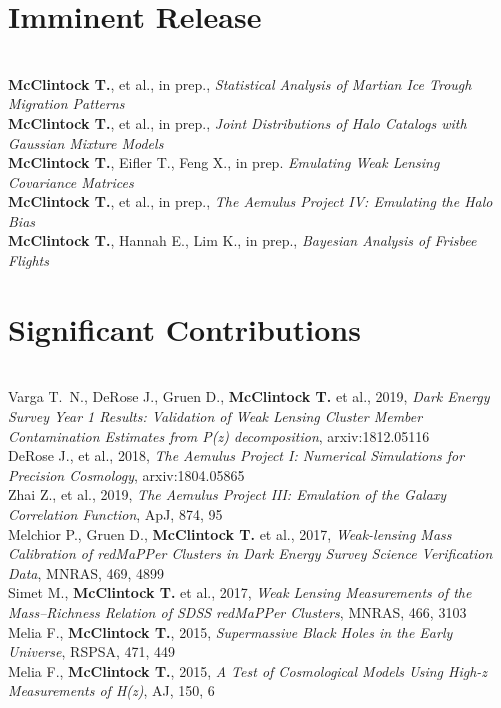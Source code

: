 \documentclass{res}
\begin{document}
\begin{resume}
\vspace{-12pt}
\section{Imminent Release}
\vspace{-8pt}
\hrulefill\\
{\bf McClintock T.}, et al., in prep., {\it Statistical Analysis of Martian Ice Trough Migration Patterns}\\
{\bf McClintock T.}, et al., in prep., {\it Joint Distributions of Halo Catalogs with Gaussian Mixture Models}\\
{\bf McClintock T.}, Eifler T., Feng X., in prep. {\it Emulating Weak Lensing Covariance Matrices}\\
{\bf McClintock T.}, et al., in prep., {\it The Aemulus Project IV: Emulating the Halo Bias}\\
{\bf McClintock T.}, Hannah E., Lim K., in prep., {\it Bayesian Analysis of Frisbee Flights}

\vspace{-12pt}
\section{Significant Contributions}
\vspace{-8pt}
\hrulefill\\
Varga T.~N., DeRose J., Gruen D., {\bf McClintock T.} et al., 2019, {\it Dark Energy Survey Year 1 Results: Validation of Weak Lensing Cluster Member Contamination Estimates from P(z) decomposition}, arxiv:1812.05116\\
DeRose J., et al., 2018, {\it The Aemulus Project I: Numerical Simulations for Precision Cosmology}, arxiv:1804.05865\\
Zhai Z., et al., 2019, {\it The Aemulus Project III: Emulation of the Galaxy Correlation Function}, ApJ, 874, 95\\
Melchior P., Gruen D., {\bf McClintock T.} et al., 2017, {\it Weak-lensing Mass Calibration of redMaPPer Clusters in Dark Energy Survey Science Verification Data}, MNRAS, 469, 4899\\
Simet M., {\bf McClintock T.} et al., 2017, {\it Weak Lensing Measurements of the Mass--Richness Relation of SDSS redMaPPer Clusters}, MNRAS, 466, 3103\\
Melia F., {\bf McClintock T.}, 2015, {\it Supermassive Black Holes in the Early Universe}, RSPSA, 471, 449\\
Melia F., {\bf McClintock T.}, 2015, {\it A Test of Cosmological Models Using High-z Measurements of H(z)}, AJ, 150, 6


\end{resume}
\end{document}
